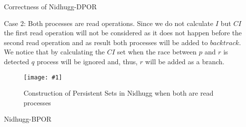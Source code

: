 \documentclass[9pt]{beamer}
\newcommand{\trace}[2]{
\begin{figure}[H]
\centering
\texttt{[image: \#1]}
\caption{#2}
\label{#2}
\end{figure}
}
\begin{document}
\begin{frame}{Correctness of Nidhugg-DPOR}
    
Case 2: Both processes are read operations. Since we do not calculate $I$ but $CI$ the first read operation will not be
considered as it does not happen before the second read operation and as result both processes will be added to
$backtrack$.  We notice that by calculating the $CI$ set when the race between $p$ and $r$ is detected $q$ process will
be ignored and, thus, $r$ will be added as a branch.

\trace{../img/nidhuggpersistent.pdf}{Construction of Persistent Sets in Nidhugg when both are read processes}
    
\end{frame}



\begin{frame}{Nidhugg-BPOR}

\begin{figure}
    
\end{figure}
    
\end{frame}
\end{document}
